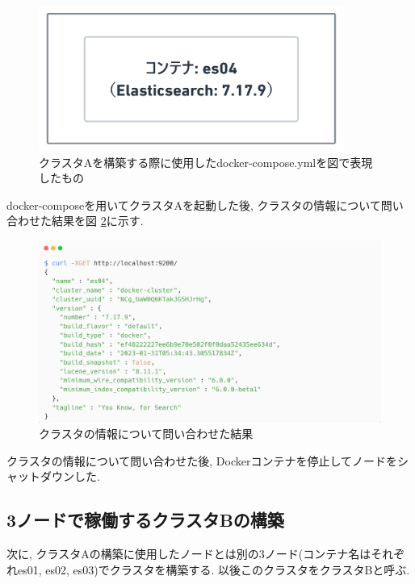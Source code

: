 \begin{figure}[H]
  \begin{center}
    \includegraphics[width=100mm]{sotu/figure/1-7.17.9.png}
    \caption{クラスタAを構築する際に使用したdocker-compose.ymlを図で表現したもの}
    \label{4-p8}
  \end{center}
\end{figure}

docker-composeを用いてクラスタAを起動した後, クラスタの情報について問い合わせた結果を図 \ref{4-p9}に示す.

\begin{figure}[H]
  \begin{center}
    \includegraphics[width=140mm]{sotu/figure/es04-cluster.png}
    \caption{クラスタの情報について問い合わせた結果}
    \label{4-p9}
  \end{center}
\end{figure}

クラスタの情報について問い合わせた後, Dockerコンテナを停止してノードをシャットダウンした.

\subsection{3ノードで稼働するクラスタBの構築}

次に, クラスタAの構築に使用したノードとは別の3ノード(コンテナ名はそれぞれes01, es02, es03)でクラスタを構築する. 以後このクラスタをクラスタBと呼ぶ.

